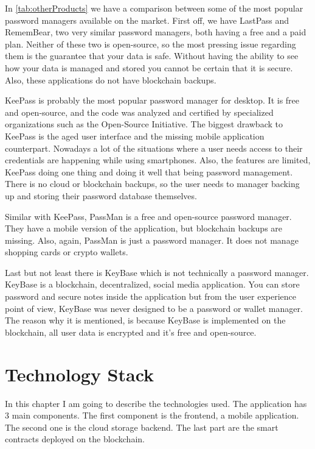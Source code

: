 \documentclass[a4paper,12pt]{report}
\begin{document}
In \autoref{tab:otherProducts} we have a comparison between some of the most
popular password managers available on the market. First off, we have
LastPass\cite{lastpass} and RememBear\cite{remembear}, two very similar
password managers, both having a free and a paid plan. Neither of these two is
open-source, so the most pressing issue regarding them is the guarantee that
your data is safe. Without having the ability to see how your data is managed
and stored you cannot be certain that it is secure. Also, these applications do
not have blockchain backups.

KeePass\cite{keepass} is probably the most popular password manager for
desktop. It is free and open-source, and the code was analyzed and certified by
specialized organizations such as the Open-Source Initiative. The biggest
drawback to KeePass is the aged user interface and the missing mobile
application counterpart. Nowadays a lot of the situations where a user needs
access to their credentials are happening while using smartphones. Also, the
features are limited, KeePass doing one thing and doing it well that being
password management. There is no cloud or blockchain backups, so the user needs
to manager backing up and storing their password database themselves.

Similar with KeePass, PassMan\cite{passman} is a free and open-source password
manager. They have a mobile version of the application, but blockchain backups
are missing. Also, again, PassMan is just a password manager. It does not
manage shopping cards or crypto wallets.

Last but not least there is KeyBase\cite{keybase} which is not technically a
password manager. KeyBase is a blockchain, decentralized, social media
application. You can store password and secure notes inside the application but
from the user experience point of view, KeyBase was never designed to be a
password or wallet manager. The reason why it is mentioned, is because KeyBase
is implemented on the blockchain, all user data is encrypted and it's free and
open-source.

\chapter{Technology Stack}

In this chapter I am going to describe the technologies used. The application
has 3 main components. The first component is the frontend, a mobile
application. The second one is the cloud storage backend. The last part are the
smart contracts deployed on the blockchain.
\end{document}
